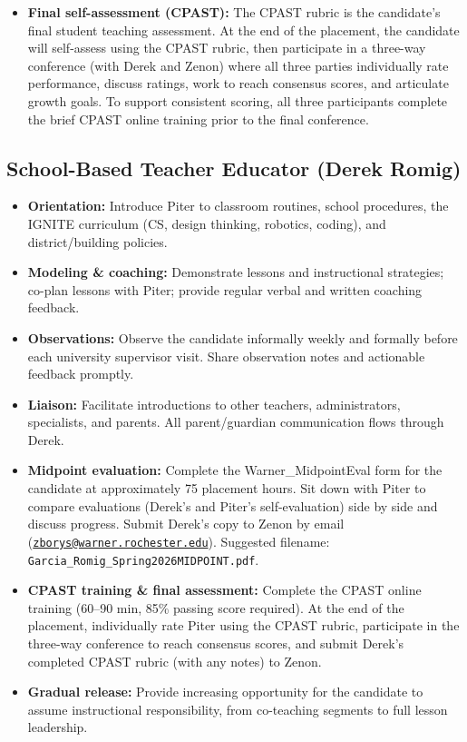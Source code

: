\documentclass[10pt]{article}
\begin{document}
\begin{itemize}[leftmargin=*,itemsep=0.25em]
  \item \textbf{Final self-assessment (CPAST):} The CPAST rubric is the candidate's final student teaching assessment. At the end of the placement, the candidate will self-assess using the CPAST rubric, then participate in a three-way conference (with Derek and Zenon) where all three parties individually rate performance, discuss ratings, work to reach consensus scores, and articulate growth goals. To support consistent scoring, all three participants complete the brief CPAST online training prior to the final conference.
\end{itemize}

\subsection{School-Based Teacher Educator (Derek Romig)}

\begin{itemize}[leftmargin=*,itemsep=0.25em]
  \item \textbf{Orientation:} Introduce Piter to classroom routines, school procedures, the IGNITE curriculum (CS, design thinking, robotics, coding), and district/building policies.
  \item \textbf{Modeling \& coaching:} Demonstrate lessons and instructional strategies; co-plan lessons with Piter; provide regular verbal and written coaching feedback.
  \item \textbf{Observations:} Observe the candidate informally weekly and formally before each university supervisor visit. Share observation notes and actionable feedback promptly.
  \item \textbf{Liaison:} Facilitate introductions to other teachers, administrators, specialists, and parents. All parent/guardian communication flows through Derek.
  \item \textbf{Midpoint evaluation:} Complete the Warner\_MidpointEval form for the candidate at approximately 75 placement hours. Sit down with Piter to compare evaluations (Derek's and Piter's self-evaluation) side by side and discuss progress. Submit Derek's copy to Zenon by email (\href{mailto:zborys@warner.rochester.edu}{\nolinkurl{zborys@warner.rochester.edu}}). Suggested filename: \nolinkurl{Garcia_Romig_Spring2026MIDPOINT.pdf}.
  \item \textbf{CPAST training \& final assessment:} Complete the CPAST online training (60--90 min, 85\% passing score required). At the end of the placement, individually rate Piter using the CPAST rubric, participate in the three-way conference to reach consensus scores, and submit Derek's completed CPAST rubric (with any notes) to Zenon.
  \item \textbf{Gradual release:} Provide increasing opportunity for the candidate to assume instructional responsibility, from co-teaching segments to full lesson leadership.
\end{itemize}
\end{document}

